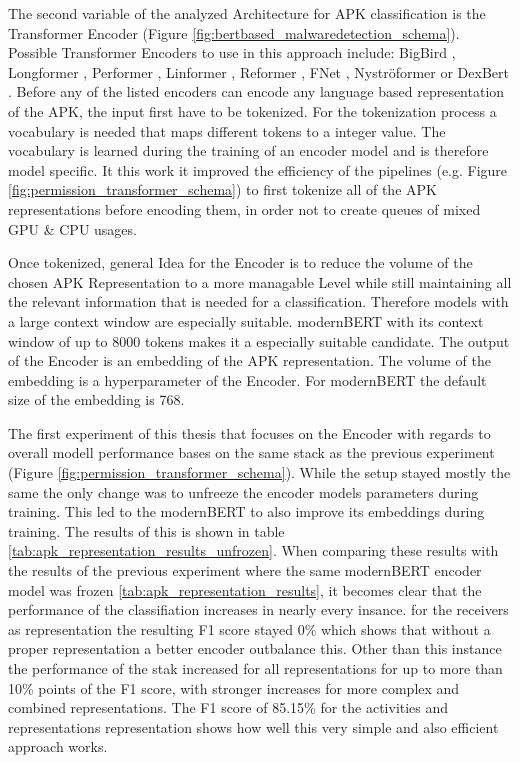 The second variable of the analyzed Architecture for 
APK classification is the Transformer Encoder 
(Figure \ref{fig:bertbased_malwaredetection_schema}).
Possible Transformer Encoders to use in this approach include: 
BigBird \cite{bigbird}, Longformer \cite{longformer}, 
Performer \cite{performer}, Linformer \cite{linformer},
Reformer \cite{reformer}, FNet \cite{fnet}, 
Nyströformer \cite{nystromformer} or DexBert \cite{dexbert}.
Before any of the listed encoders can encode any language based representation
of the APK, the input first have to be tokenized.
For the tokenization process a vocabulary is needed that maps different tokens
to a integer value. The vocabulary is learned during the training of an encoder model 
and is therefore model specific. It this work it improved the efficiency of 
the pipelines (e.g. Figure \ref{fig:permission_transformer_schema}) 
to first tokenize all of the APK representations before encoding them, 
in order not to create queues of mixed GPU \& CPU usages.

Once tokenized,  general Idea for the Encoder is to reduce the volume of the chosen
APK Representation to a more managable Level while still maintaining all 
the relevant information that is needed for a classification.
Therefore models with a large context window are especially suitable.
modernBERT \cite{modernbert} with its context window of up to 8000 tokens
makes it a especially suitable candidate.
The output of the Encoder is an embedding of the APK representation.
The volume of the embedding is a hyperparameter of the Encoder.
For modernBERT the default size of the embedding is 768.

The first experiment of this thesis that focuses on the Encoder with regards
to overall modell performance bases on the same stack as the previous experiment
(Figure \ref{fig:permission_transformer_schema}).
While the setup stayed mostly the same the only change was to unfreeze the 
encoder models parameters during training. This led to the modernBERT to 
also improve its embeddings during training. The results of this is shown in 
table \ref{tab:apk_representation_results_unfrozen}. When comparing these 
results with the results of the previous experiment where the same modernBERT
encoder model was frozen \ref{tab:apk_representation_results}, it becomes 
clear that the performance of the classifiation increases in nearly every insance.
for the receivers as representation the resulting F1 score stayed 0\% which shows
that without a proper representation a better encoder outbalance this.
Other than this instance the performance of the stak increased for all representations
for up to more than 10\% points of the F1 score, with stronger increases for
more complex and combined representations. The F1 score of 85.15\% for the 
activities and representations representation shows how well this very simple
and also efficient approach works.

